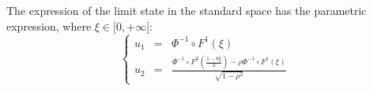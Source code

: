 {                The expression of the limit state in the standard space has the parametric expression, where $\xi \in [0,+\infty[$:
                    \begin{equation}\label{SelRosCan}
                      \left\{
                      \begin{array}{lcl}
                        u_1 & = & \Phi^{-1} \circ F^1(\xi) \\
                        u_2 & = & \displaystyle \frac{ \Phi^{-1} \circ F^2( \frac{1-8\xi}{2}) - \rho  \Phi^{-1} \circ F^1(\xi)}{\sqrt{1-\rho^2}}
                      \end{array}
                      \right.
                    \end{equation}


                  }
